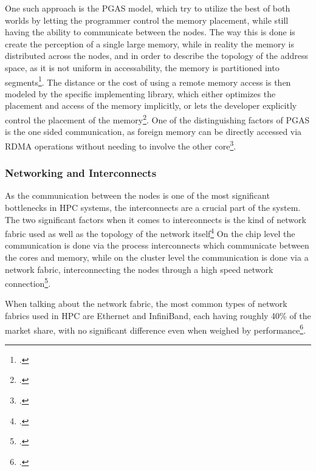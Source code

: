One such approach is the \ac{PGAS} model, which try to utilize the best of both worlds by letting the programmer
control the memory placement, while still having the ability to communicate between the nodes.
The way this is done is create the perception of a single large memory, while in reality the memory is distributed across the nodes,
and in order to describe the topology of the address space, as it is not uniform in accessability, the memory is partitioned into segments\footcite{dewaelPartitionedGlobalAddress2015}.
The distance or the cost of using a remote memory access is then modeled by the specific implementing library,
which either optimizes the placement and access of the memory implicitly, or lets the developer explicitly control the placement of the memory\footcite{almasiPGASPartitionedGlobal2011}.
One of the distinguishing factors of \ac{PGAS} is the one sided communication, as foreign memory can be directly
accessed via \ac{RDMA} operations without needing to involve the other core\footcite{dewanPavingWayDistributed2020}.



\subsubsection{Networking and Interconnects}
\label{sec:networking_interconnects}

As the communication between the nodes is one of the most significant bottlenecks in \ac{HPC} systems, the interconnects are a crucial part of the system.
The two significant factors when it comes to interconnects is the kind of network fabric used as well as the topology of the network itself\footcite{bestaHighPerformanceRoutingMultipathing2021}
On the chip level the communication is done via the process interconnects which communicate between the cores and memory, while on the cluster level the
communication is done via a network fabric, interconnecting the nodes through a high speed network connection\footcite{dongarraHighperformanceComputingClusters2005}.

When talking about the network fabric, the most common types of network fabrics used in \ac{HPC} are Ethernet and InfiniBand,
each having roughly 40\% of the market share, with no significant difference even when weighed by performance\footcite{top500ListStatisticsInterconnect}.


